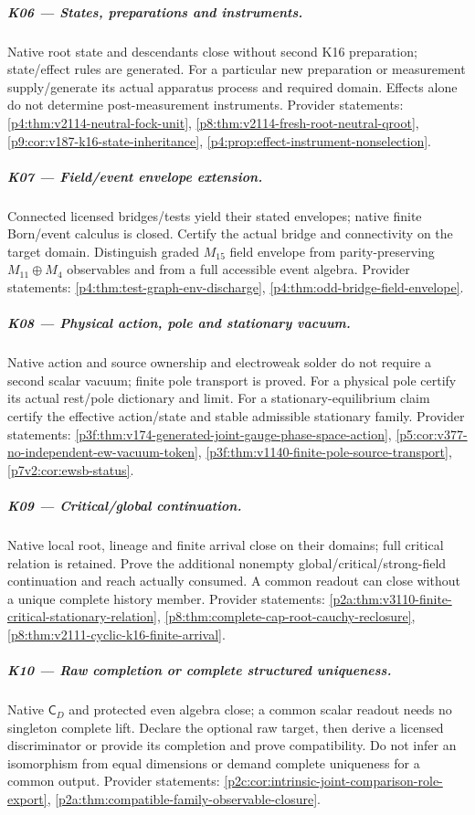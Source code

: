\documentclass[12pt,a4paper]{article}
\begin{document}
\subparagraph{K06 --- States, preparations and instruments.}
Native root state and descendants close without second K16 preparation; state/effect rules are generated. For a particular new preparation or measurement supply/generate its actual apparatus process and required domain. Effects alone do not determine post-measurement instruments. Provider statements: \ref{p4:thm:v2114-neutral-fock-unit}, \ref{p8:thm:v2114-fresh-root-neutral-qroot}, \ref{p9:cor:v187-k16-state-inheritance}, \ref{p4:prop:effect-instrument-nonselection}.

\subparagraph{K07 --- Field/event envelope extension.}
Connected licensed bridges/tests yield their stated envelopes; native finite Born/event calculus is closed. Certify the actual bridge and connectivity on the target domain. Distinguish graded $M_{15}$ field envelope from parity-preserving $M_{11}\oplus M_4$ observables and from a full accessible event algebra. Provider statements: \ref{p4:thm:test-graph-env-discharge}, \ref{p4:thm:odd-bridge-field-envelope}.

\subparagraph{K08 --- Physical action, pole and stationary vacuum.}
Native action and source ownership and electroweak solder do not require a second scalar vacuum; finite pole transport is proved. For a physical pole certify its actual rest/pole dictionary and limit. For a stationary-equilibrium claim certify the effective action/state and stable admissible stationary family. Provider statements: \ref{p3f:thm:v174-generated-joint-gauge-phase-space-action}, \ref{p5:cor:v377-no-independent-ew-vacuum-token}, \ref{p3f:thm:v1140-finite-pole-source-transport}, \ref{p7v2:cor:ewsb-status}.

\subparagraph{K09 --- Critical/global continuation.}
Native local root, lineage and finite arrival close on their domains; full critical relation is retained. Prove the additional nonempty global/critical/strong-field continuation and reach actually consumed. A common readout can close without a unique complete history member. Provider statements: \ref{p2a:thm:v3110-finite-critical-stationary-relation}, \ref{p8:thm:complete-cap-root-cauchy-reclosure}, \ref{p8:thm:v2111-cyclic-k16-finite-arrival}.

\subparagraph{K10 --- Raw completion or complete structured uniqueness.}
Native $\mathsf C_D$ and protected even algebra close; a common scalar readout needs no singleton complete lift. Declare the optional raw target, then derive a licensed discriminator or provide its completion and prove compatibility. Do not infer an isomorphism from equal dimensions or demand complete uniqueness for a common output. Provider statements: \ref{p2c:cor:intrinsic-joint-comparison-role-export}, \ref{p2a:thm:compatible-family-observable-closure}.
\end{document}
